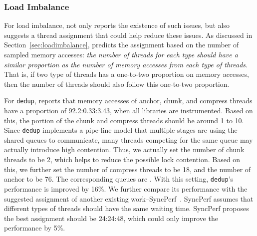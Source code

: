 

\subsubsection{Load Imbalance}

For load imbalance, \NP{} not only reports the existence of such issues, but also suggests a thread assignment that could help reduce these issues. As discussed in Section~\ref{sec:loadimbalance}, \NP{} predicts the assignment based on the number of sampled memory accesses: \textit{the number of threads for each type should have a similar proportion as the number of memory accesses from each type of threads}. That is, if two type
of threads has a one-to-two proportion on memory accesses, then the number of threads should also follow this one-to-two proportion. 

For \texttt{dedup}, \NP{} reports that memory accesses of anchor, chunk, and compress threads have a proportion of 92.2:0.33:3.43, when all libraries are instrumented. Based on this, the portion of the chunk and compress threads should be around 1 to 10. 
Since \texttt{dedup} implements a pipe-line model that multiple stages are using the shared queues to communicate, 
many threads competing for the same queue may actually introduce high contention. Thus, we actually set the  number of chunk threads to be 2, which helps to reduce the possible lock contention. Based on this, we further set the number of compress threads to be 18, and the number of anchor to be 76. The corresponding queues are . With this setting, \texttt{dedup}'s performance is improved by 16\%. We further compare its performance with the suggested assignment of another existing work--SyncPerf~\cite{SyncPerf}. SyncPerf assumes that different types of threads should have the same waiting time. SyncPerf proposes the best assignment should be 24:24:48, which could only improve the performance by 5\%. 

